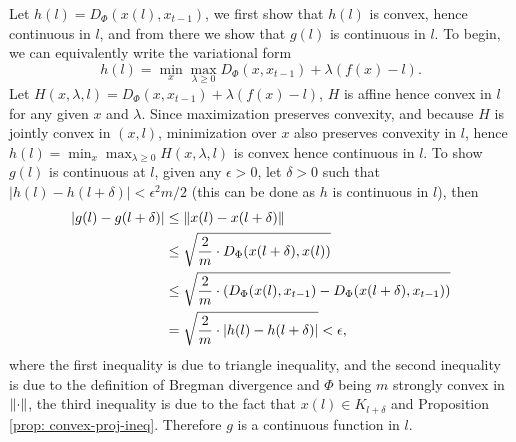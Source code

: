 	Let $h(l) = D_{\Phi}(x(l), x_{t-1})$, we first show that $h(l)$ is convex, hence continuous in $l$, and from there we show that $g(l)$ is continuous in $l$. To begin, we can equivalently write the variational form 
	\[ h(l)= \min_x \max_{\lambda\ge 0} D_\Phi(x, x_{t-1}) + \lambda(f(x) - l).\]
	Let $H(x, \lambda, l ) = D_\Phi(x, x_{t-1}) + \lambda(f(x) - l)$, $H$ is affine hence convex in $l$ for any given $x$ and $\lambda$. Since maximization preserves convexity, and because $H$ is jointly convex in $(x, l)$, minimization over $x$ also preserves convexity in $l$, hence $h(l) = \min_x \max_{\lambda \ge 0} H(x, \lambda, l)$ is convex hence continuous in $l$. 
	To show $g(l)$ is continuous at $l$, given any $\epsilon >0$, let $\delta>0$ such that $|h(l) - h(l+\delta) | < \epsilon^2 m / 2$ (this can be done as $h$ is continuous in $l$), then 
	\begin{align*}
	 | g(l) - g(l+\delta) | & \le \left\lVert x(l) - x(l+\delta) \right\rVert \\
	 & \le \sqrt{ \frac{2}{m} \cdot D_\Phi(x(l+\delta), x(l))} \\
	 & \le \sqrt{ \frac{2}{m} \cdot (D_{\Phi}(x(l), x_{t-1}) - D_\Phi(x(l+\delta), x_{t-1})) } \\
	 & = \sqrt{ \frac{2}{m} \cdot | h(l) - h(l+\delta)| } < \epsilon,
	 \end{align*}
	 where the first inequality is due to triangle inequality, and the second inequality is due to the definition of Bregman divergence and $\Phi$ being $m$ strongly convex in $\left\lVert \cdot \right\rVert$, the third inequality is due to the fact that $x(l) \in K_{l+\delta}$ and Proposition \ref{prop: convex-proj-ineq}. Therefore $g$ is a continuous function in $l$.


